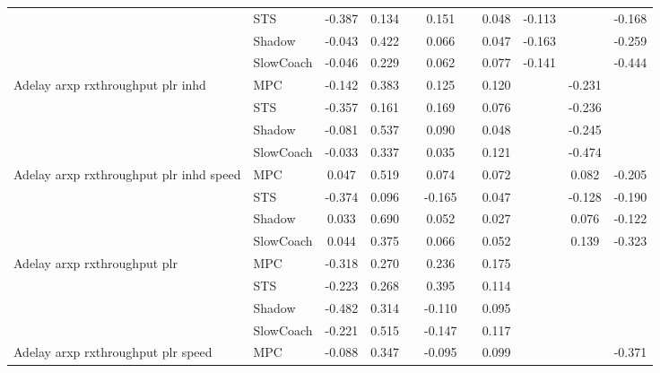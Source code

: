 \begin{tabular}{|l|l|*{9}{c|}}
                              & STS &   -0.387 &     0.134 &        &  0.151 &     &  0.048 &  -0.113 &      &   -0.168 \\
                              & Shadow &   -0.043 &     0.422 &        &  0.066 &     &  0.047 &  -0.163 &      &   -0.259 \\
                              & SlowCoach &   -0.046 &     0.229 &        &  0.062 &     &  0.077 &  -0.141 &      &   -0.444 \\
\midrule
Adelay arxp rxthroughput plr inhd    & MPC &   -0.142 &     0.383 &        &  0.125 &     &  0.120 &      &  -0.231 &       \\
                              & STS &   -0.357 &     0.161 &        &  0.169 &     &  0.076 &      &  -0.236 &       \\
                              & Shadow &   -0.081 &     0.537 &        &  0.090 &     &  0.048 &      &  -0.245 &       \\
                              & SlowCoach &   -0.033 &     0.337 &        &  0.035 &     &  0.121 &      &  -0.474 &       \\
\midrule
Adelay arxp rxthroughput plr inhd speed    & MPC &    0.047 &     0.519 &        &  0.074 &     &  0.072 &      &   0.082 &   -0.205 \\
                              & STS &   -0.374 &     0.096 &        & -0.165 &     &  0.047 &      &  -0.128 &   -0.190 \\
                              & Shadow &    0.033 &     0.690 &        &  0.052 &     &  0.027 &      &   0.076 &   -0.122 \\
                              & SlowCoach &    0.044 &     0.375 &        &  0.066 &     &  0.052 &      &   0.139 &   -0.323 \\
\midrule
Adelay arxp rxthroughput plr    & MPC &   -0.318 &     0.270 &        &  0.236 &     &  0.175 &      &      &       \\
                              & STS &   -0.223 &     0.268 &        &  0.395 &     &  0.114 &      &      &       \\
                              & Shadow &   -0.482 &     0.314 &        & -0.110 &     &  0.095 &      &      &       \\
                              & SlowCoach &   -0.221 &     0.515 &        & -0.147 &     &  0.117 &      &      &       \\
\midrule
Adelay arxp rxthroughput plr speed    & MPC &   -0.088 &     0.347 &        & -0.095 &     &  0.099 &      &      &   -0.371 \\

\end{tabular}
